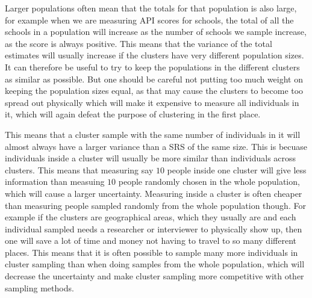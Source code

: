 \documentclass{article}
\begin{document}
Larger populations often mean that the totals for that population is also large,
for example when we are measuring API scores for schools, the total of all the
schools in a population will increase as the number of schools we sample
increase, as the score is always positive. This means that the variance of the
total estimates will usually increase if the clusters have very different
population sizes. It can therefore be useful to try to keep the populations in
the different clusters as similar as possible. But one should be careful not
putting too much weight on keeping the population sizes equal, as that may cause
the clusters to become too spread out physically which will make it expensive to
measure all individuals in it, which will again defeat the purpose of clustering
in the first place.

This means that a cluster sample with the same number of individuals in it will
almost always have a larger variance than a SRS of the same size. This is
becuase individuals inside a cluster will usually be more similar than
individuals across clusters. This means that measuring say \(10\) people inside
one cluster will give less information than measuing \(10\) people randomly
chosen in the whole population, which will cause a larger uncertainty. Measuring
inside a cluster is often cheaper than measuring people sampled randomly from
the whole population though. For example if the clusters are geographical areas,
which they usually are and each individual sampled needs a researcher or
interviewer to physically show up, then one will save a lot of time and money
not having to travel to so many different places. This means that it is often possible to sample
many more individuals in cluster sampling than when doing samples from the whole
population, which will decrease the uncertainty and make cluster sampling more
competitive with other sampling methods.
\end{document}
